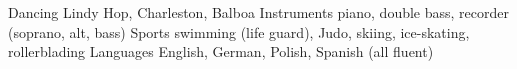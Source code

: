 \begin{cvskills}
  \cvskill
    {Dancing}
    {Lindy Hop, Charleston, Balboa}
  \cvskill
    {Instruments}
    {piano, double bass, recorder (soprano, alt, bass)}
  \cvskill
    {Sports}
    {swimming (life guard), Judo, skiing, ice-skating, rollerblading}
  \cvskill
    {Languages}
    {English, German, Polish, Spanish (all fluent)}
\end{cvskills}
